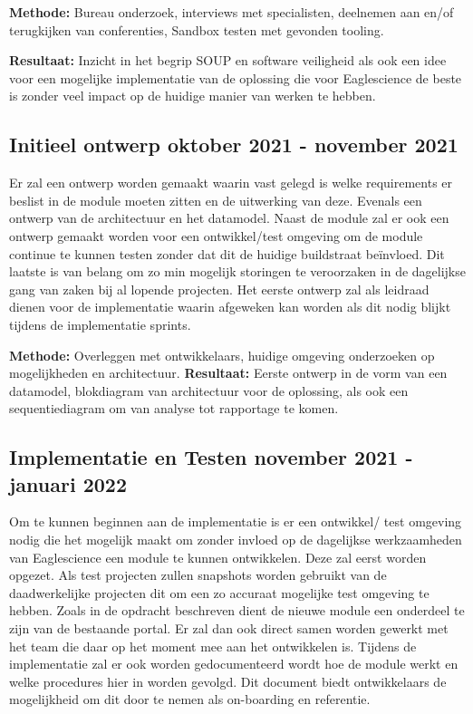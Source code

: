 \textbf{Methode:} Bureau onderzoek, interviews met specialisten, deelnemen aan en/of terugkijken van conferenties, Sandbox testen met gevonden tooling.

\textbf{Resultaat:} Inzicht in het begrip SOUP en software veiligheid als ook een idee voor een mogelijke implementatie van de oplossing die voor Eaglescience de beste is zonder veel impact op de huidige manier van werken te hebben.

\subsection{Initieel ontwerp \textbf{oktober 2021 - november 2021 }}\label{subsec:initieel-ontwerp}
Er zal een ontwerp worden gemaakt waarin vast gelegd is welke requirements er beslist in de module moeten zitten en de uitwerking van deze. Evenals een ontwerp van de architectuur en het datamodel. Naast de module zal er ook een ontwerp gemaakt worden voor een ontwikkel/test omgeving om de module continue te kunnen testen zonder dat dit de huidige buildstraat beïnvloed. Dit laatste is van belang om zo min mogelijk storingen te veroorzaken in de dagelijkse gang van zaken bij al lopende projecten. Het eerste ontwerp zal als leidraad dienen voor de implementatie waarin afgeweken kan worden als dit nodig blijkt tijdens de implementatie sprints.

\textbf{Methode:} Overleggen met ontwikkelaars, huidige omgeving onderzoeken op mogelijkheden en architectuur.
\textbf{Resultaat:} Eerste ontwerp in de vorm van een datamodel, blokdiagram van architectuur voor de oplossing, als ook een sequentiediagram om van analyse tot rapportage te komen.

\subsection{Implementatie en Testen \textbf{november 2021 - januari 2022 }}\label{subsec:implementatie-en-testen}
Om te kunnen beginnen aan de implementatie is er een ontwikkel/ test omgeving nodig die het mogelijk maakt om zonder invloed op de dagelijkse werkzaamheden van Eaglescience een module te kunnen ontwikkelen. Deze zal eerst worden opgezet. Als test projecten zullen snapshots worden gebruikt van de daadwerkelijke projecten dit om een zo accuraat mogelijke test omgeving te hebben. Zoals in de opdracht beschreven dient de nieuwe module een onderdeel te zijn van de bestaande portal. Er zal dan ook direct samen worden gewerkt met het team die daar op het moment mee aan het ontwikkelen is. Tijdens de implementatie zal er ook worden gedocumenteerd wordt hoe de module werkt en welke procedures hier in worden gevolgd. Dit document biedt ontwikkelaars de mogelijkheid om dit door te nemen als on-boarding en referentie.

